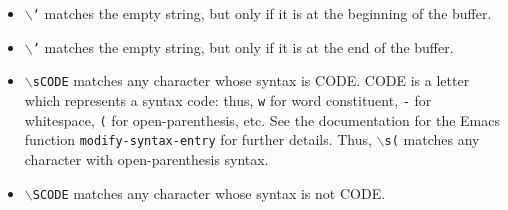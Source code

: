 \begin{itemize}
\itemsep=0pt

\item \rtfsp
{\tt $\backslash$`} 
matches the empty string, but only if it is at the beginning of
the buffer.

\item \rtfsp
{\tt $\backslash$'} 
matches the empty string, but only if it is at the end of the
buffer.

\item \rtfsp
{\tt $\backslash$sCODE} 
matches any character whose syntax is CODE. CODE is a letter
which represents a syntax code: thus, {\tt w} for word constituent,
{\tt -} for whitespace, {\tt (} for open-parenthesis, etc. See the
documentation for the Emacs function {\tt modify-syntax-entry} for
further details.
Thus, {\tt $\backslash$s(} matches any character with open-parenthesis syntax.

\item \rtfsp
{\tt $\backslash$SCODE} 
matches any character whose syntax is not CODE.

\end{itemize}





\printindex


